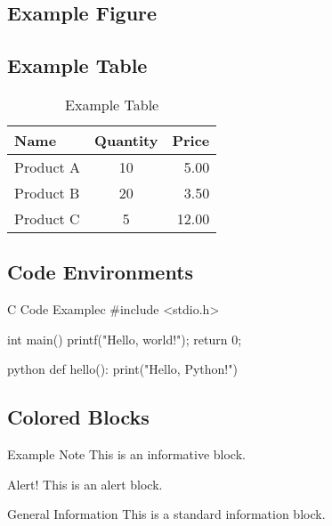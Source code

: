 \documentclass[11pt]{custom-report}
\begin{document}
\subsection{Example Figure}

\subsection{Example Table}

\begin{table}[ht]
\centering
\caption{Example Table}
\label{tab_example}
\begin{tabular}{@{}lcr@{}}
\toprule
Name & Quantity & Price \\
\midrule
Product A & 10 & 5.00 \\
Product B & 20 & 3.50 \\
Product C & 5 & 12.00 \\
\bottomrule
\end{tabular}
\end{table}

\subsection{Code Environments}

\begin{code}{C Code Example}{c}
#include <stdio.h>

int main() {
    printf("Hello, world!\n");
    return 0;
}
\end{code}

\begin{shortcode}{python}
def hello():
    print("Hello, Python!")
\end{shortcode}

\subsection{Colored Blocks}

\begin{exampleblock}{Example Note}
This is an informative block.
\end{exampleblock}

\begin{alertblock}{Alert!}
This is an alert block.
\end{alertblock}

\begin{block}{General Information}
This is a standard information block.
\end{block}
\end{document}
